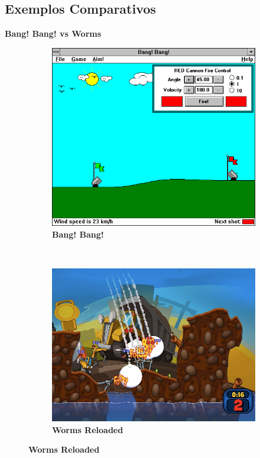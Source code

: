 \expandafter\documentclass\expandafter[table, usenames, svgnames, dvipsnames, \classopts]{beamer}
\begin{document}
\subsection{Exemplos Comparativos}

\begin{frame}{\textbf{Bang! Bang! vs Worms}}

	\begin{figure}
	    \centering

	    \begin{subfigure}[!h]{0.4\paperwidth}
	    	\centering
	    	\includegraphics[height=0.4\paperheight]{bang_bang}
	        \caption{\scriptsize\textbf{Bang! Bang!}\footnotemark{}}
	    \end{subfigure}
	    ~
		\begin{subfigure}[!h]{0.4\paperwidth}
			\centering
	        \includegraphics[height=0.4\paperheight]{worms}
	        \caption{\scriptsize\textbf{Worms Reloaded}\footnotemark{}}
	    \end{subfigure}
    \end{figure}


\end{frame}
\end{document}

